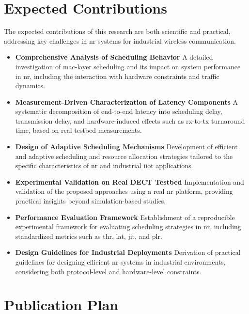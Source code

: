 \documentclass[12pt,a4paper]{article}
\begin{document}
\section{Expected Contributions}

The expected contributions of this research are both scientific and practical, addressing key challenges in \gls{nr} systems for industrial wireless communication.

\begin{itemize}

\item \textbf{Comprehensive Analysis of Scheduling Behavior}  
A detailed investigation of \gls{mac}-layer scheduling and its impact on system performance in \gls{nr}, including the interaction with hardware constraints and traffic dynamics.

\item \textbf{Measurement-Driven Characterization of Latency Components}  
A systematic decomposition of end-to-end latency into scheduling delay, transmission delay, and hardware-induced effects such as \gls{rx}-to-\gls{tx} turnaround time, based on real testbed measurements.

\item \textbf{Design of Adaptive Scheduling Mechanisms}  
Development of efficient and adaptive scheduling and resource allocation strategies tailored to the specific characteristics of \gls{nr} and industrial \gls{iiot} applications.

\item \textbf{Experimental Validation on Real DECT Testbed}  
Implementation and validation of the proposed approaches using a real \gls{nr} platform, providing practical insights beyond simulation-based studies.

\item \textbf{Performance Evaluation Framework}  
Establishment of a reproducible experimental framework for evaluating scheduling strategies in \gls{nr}, including standardized metrics such as \gls{thr}, \gls{lat}, \gls{jit}, and \gls{plr}.

\item \textbf{Design Guidelines for Industrial Deployments}  
Derivation of practical guidelines for designing efficient \gls{nr} systems in industrial environments, considering both protocol-level and hardware-level constraints.

\end{itemize}
\section{Publication Plan}
\end{document}
